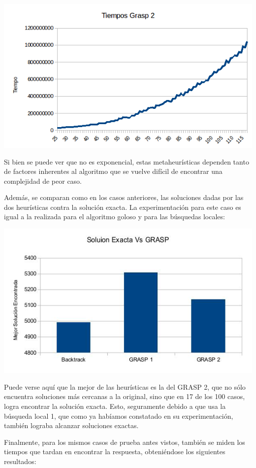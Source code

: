 \includegraphics[scale=0.5]{Ej5/tiempog2.png}

Si bien se puede ver que no es exponencial, estas metaheurísticas dependen tanto de factores inherentes al algoritmo que se vuelve difícil de encontrar una complejidad de peor caso.

Además, se comparan como en los casos anteriores, las soluciones dadas por las dos heurísticas contra la solución exacta. La experimentación para este caso es igual a la realizada para el algoritmo goloso y para las búsquedas locales:

\includegraphics[scale=0.5]{Ej5/graspSol.jpg}

Puede verse aquí que la mejor de las heurísticas es la del GRASP 2, que no sólo encuentra soluciones más cercanas a la original, sino que en 17 de los 100 casos, logra encontrar la solución exacta. Esto, seguramente debido a que usa la búsqueda local 1, que como ya habíamos constatado en su experimentación, también lograba alcanzar soluciones exactas.

Finalmente, para los mismos casos de prueba antes vistos, también se miden los tiempos que tardan en encontrar la respuesta, obteniéndose los siguientes resultados:

